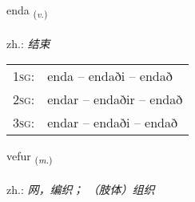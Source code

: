 \documentclass[frontgrid, backgrid]{flacards}\usepackage[]{graphicx}\usepackage[]{xcolor}
\begin{document}
\renewcommand{\flhead}{\vskip5pt \fboxsep=0pt {\small\bfseries\footnotesize Sagnorð | 动词}}
\renewcommand{\fcfoot}{\vskip5pt \fboxsep=0pt \hspace{2pt}{\small\bfseries\footnotesize 1K}}

\renewcommand{\blhead}{\vskip5pt {\small\bfseries\footnotesize Sagnorð | 动词 }}
\renewcommand{\bcfoot}{\vskip5pt \hspace{2pt}{\small\bfseries\footnotesize 1K}}


{enda \small{\textsubscript{(\textit{v.})}} \\[1ex] %
\textphonetic{[ɛnta]} \\
zh.: \emph{结束} \\  [2ex]
\renewcommand*{\arraystretch}{0.8}
\begin{tabular}{p{1cm}l}
\textsc{1sg}: & enda -- endaði -- endað \\ 
\textsc{2sg}: & endar -- endaðir -- endað \\ 
\textsc{3sg}: & endar -- endaði -- endað \\ 
\end{tabular}
}

\renewcommand{\flhead}{\vskip5pt \fboxsep=0pt {\small\bfseries\footnotesize Nafnorð | 名词}}
\renewcommand{\fcfoot}{\vskip5pt \fboxsep=0pt \hspace{2pt}{\small\bfseries\footnotesize 1K}}

\renewcommand{\blhead}{\vskip5pt {\small\bfseries\footnotesize Nafnorð | 名词 }}
\renewcommand{\bcfoot}{\vskip5pt \hspace{2pt}{\small\bfseries\footnotesize 1K}}


{vefur \small{\textsubscript{(\textit{m.})}} \\[1ex] %
\textphonetic{[vɛːvʏr]} \\
zh.: \emph{网，编织； （肢体）组织} \\  [2ex]
\renewcommand*{\arraystretch}{0.8}
}
\end{document}

